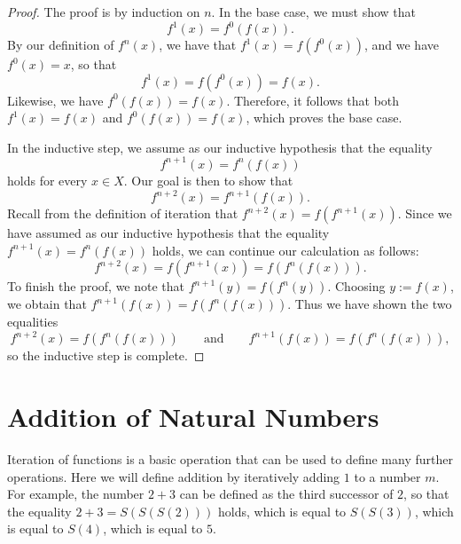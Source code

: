 \begin{proof}
  The proof is by induction on $n$. In the base case, we must show that
  \begin{equation*}
    f^1(x) = f^0(f(x)).
  \end{equation*}
  By our definition of $f^n(x)$, we have that $f^1(x)=f(f^0(x))$, and we have $f^0(x)=x$, so that
  \begin{equation*}
    f^1(x)=f(f^0(x))=f(x).
  \end{equation*}
  Likewise, we have $f^0(f(x))=f(x)$. Therefore, it follows that both $f^1(x)=f(x)$ and $f^0(f(x))=f(x)$, which proves the base case.

  In the inductive step, we assume as our inductive hypothesis that the equality
  \begin{equation*}
    f^{n+1}(x)=f^n(f(x))
  \end{equation*}
  holds for every $x\in X$. Our goal is then to show that
  \begin{equation*}
    f^{n+2}(x)=f^{n+1}(f(x)).
  \end{equation*}
  Recall from the definition of iteration that $f^{n+2}(x)=f(f^{n+1}(x))$. Since we have assumed as our inductive hypothesis that the equality $f^{n+1}(x)=f^n(f(x))$ holds, we can continue our calculation as follows:
  \begin{equation*}
    f^{n+2}(x) = f(f^{n+1}(x)) = f(f^n(f(x))).
  \end{equation*}
  To finish the proof, we note that $f^{n+1}(y)=f(f^n(y))$. Choosing $y:=f(x)$, we obtain that $f^{n+1}(f(x))=f(f^n(f(x)))$. Thus we have shown the two equalities
  \begin{equation*}
    f^{n+2}(x) = f(f^n(f(x))) \qquad\text{and}\qquad f^{n+1}(f(x)) = f(f^n(f(x))),
  \end{equation*}
  so the inductive step is complete.
\end{proof}

\section{Addition of Natural Numbers}

Iteration of functions is a basic operation that can be used to define many further operations. Here we will define addition by iteratively adding $1$ to a number $m$. For example, the number $2+3$ can be defined as the third successor of $2$, so that the equality $2+3=S(S(S(2)))$ holds, which is equal to $S(S(3))$, which is equal to $S(4)$, which is equal to $5$.

